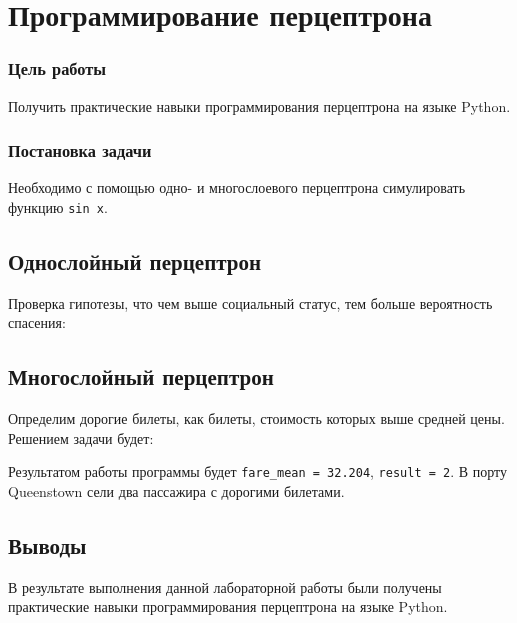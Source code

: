 



\newcommand{\labnumber}{2} %



\graphicspath{{figures/}}


\Ukrainian


\addtocounter{page}{1}

\section*{Программирование перцептрона}
\subsubsection*{Цель работы}
Получить практические навыки программирования перцептрона на языке Python.
\subsubsection*{Постановка задачи}
Необходимо с помощью одно- и многослоевого перцептрона симулировать функцию \texttt{sin x}.

\subsection*{Однослойный перцептрон}
Проверка гипотезы, что чем выше социальный статус, тем больше вероятность спасения:

\subsection{Многослойный перцептрон}
Определим дорогие билеты, как билеты, стоимость которых выше средней цены. Решением задачи будет:

Результатом работы программы будет \texttt{fare\_mean = 32.204}, \texttt{result = 2}. В порту Queenstown сели два пассажира с дорогими билетами.

\subsection*{Выводы}
В результате выполнения данной лабораторной работы были получены практические навыки программирования перцептрона на языке Python.


